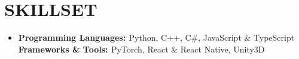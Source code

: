 \documentclass[letterpaper,11pt]{article}
\makeatletter
\newcommand{\resumeItem}[1]{
  \item\small{
    {#1 \vspace{-2pt}}
  }
}
\newcommand{\extracurricular}[3]{
    \vspace{-2pt}\item
    \begin{tabular*}{1.0\textwidth}[t]{l@{\extracolsep{\fill}}r}
      \textbf{#1} \\
      {#2} & \textit{#3} \\
    \end{tabular*}\vspace{-7pt}
}
\newcommand{\resumeSubHeadingListStart}{\begin{itemize}[leftmargin=0.0in, label={}]}
\newcommand{\resumeSubHeadingListEnd}{\end{itemize}}
\newcommand{\resumeItemListStart}{\begin{itemize}}
\newcommand{\resumeItemListEnd}{\end{itemize}\vspace{-5pt}}
\makeatother
\begin{document}


\section{SKILLSET}
\resumeSubHeadingListStart
\item {\textbf{\small{Programming Languages: }}Python, C++, C\#, JavaScript \& TypeScript} \\ {\textbf{\small{Frameworks \& Tools: }}PyTorch, React \& React Native, Unity3D}
\resumeSubHeadingListEnd
\end{document}
